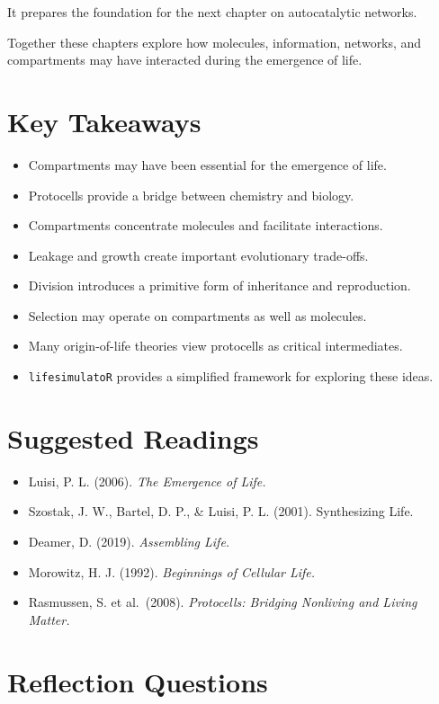 \documentclass[
  oneside,
  openany]{book}
\providecommand{\tightlist}{%
  \setlength{\itemsep}{0pt}\setlength{\parskip}{0pt}}
\begin{document}
It prepares the foundation for the next chapter on autocatalytic networks.

Together these chapters explore how molecules, information, networks, and compartments may have interacted during the emergence of life.

\section{Key Takeaways}\label{key-takeaways-2}

\begin{itemize}
\tightlist
\item
  Compartments may have been essential for the emergence of life.
\item
  Protocells provide a bridge between chemistry and biology.
\item
  Compartments concentrate molecules and facilitate interactions.
\item
  Leakage and growth create important evolutionary trade-offs.
\item
  Division introduces a primitive form of inheritance and reproduction.
\item
  Selection may operate on compartments as well as molecules.
\item
  Many origin-of-life theories view protocells as critical intermediates.
\item
  \texttt{lifesimulatoR} provides a simplified framework for exploring these ideas.
\end{itemize}

\section{Suggested Readings}\label{suggested-readings-2}

\begin{itemize}
\tightlist
\item
  Luisi, P. L. (2006). \emph{The Emergence of Life.}
\item
  Szostak, J. W., Bartel, D. P., \& Luisi, P. L. (2001). Synthesizing Life.
\item
  Deamer, D. (2019). \emph{Assembling Life.}
\item
  Morowitz, H. J. (1992). \emph{Beginnings of Cellular Life.}
\item
  Rasmussen, S. et al.~(2008). \emph{Protocells: Bridging Nonliving and Living Matter.}
\end{itemize}

\section{Reflection Questions}\label{reflection-questions-4}
\end{document}
